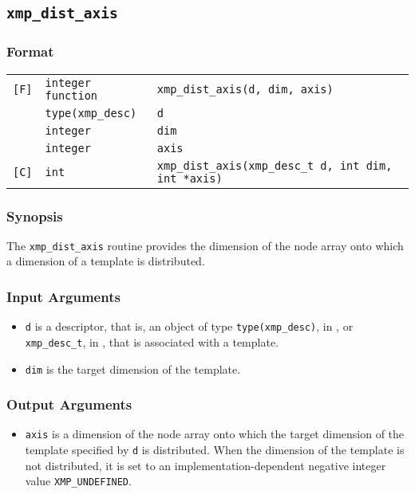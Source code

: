 \subsection{\tt xmp\_dist\_axis}

\subsubsection*{Format}

\begin{tabular}{lll}

\verb![F]!& {\tt integer function}& {\tt xmp\_dist\_axis(d, dim, axis)}\\
          & {\tt type(xmp\_desc)} & {\tt d}\\
          & {\tt integer} & {\tt dim}\\
          & {\tt integer} & {\tt axis}\\

\verb![C]!&  {\tt int}& {\tt xmp\_dist\_axis(xmp\_desc\_t d, int dim, int *axis)}\\

\end{tabular}

\subsubsection*{Synopsis}

The {\tt xmp\_dist\_axis} routine provides the dimension of the node
array onto which a dimension of a template is distributed.

\subsubsection*{Input Arguments}
\begin{itemize}
 \item {\tt d} is a descriptor, that is, an object of type 
       {\tt type(xmp\_desc)}, in {\XMPF}, or {\tt xmp\_desc\_t},
       in {\XMPC}, that is associated with a template.
 \item {\tt dim} is the target dimension of the template.
\end{itemize}

\subsubsection*{Output Arguments}
\begin{itemize}
 \item {\tt axis} is a dimension of the node array onto which 
       the target dimension of the template specified by {\tt d} is
       distributed.  When the dimension of the template is not
       distributed, it is set to an implementation-dependent negative
       integer value {\tt XMP\_UNDEFINED}.


\end{itemize}


